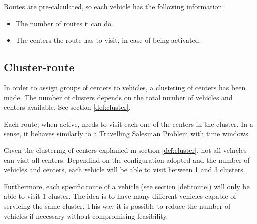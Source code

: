 Routes are pre-calculated, so each vehicle has the following information:

\begin{itemize}
	\item The number of routes it can do.
	\item The centers the route has to visit, in case of being activated.
\end{itemize}

\subsection{Cluster-route}

In order to assign groups of centers to vehicles, a clustering of centers has been made. The number of clusters depends on the total number of vehicles and centers available. See section \ref{def:cluster}.

Each route, when active, needs to visit each one of the centers in the cluster. In a sense, it behaves similarly to a Travelling Salesman Problem with time windows.

Given the clustering of centers explained in section \ref{def:cluster}, not all vehicles can visit all centers. Dependind on the configuration adopted and the number of vehicles and centers, each vehicle will be able to visit between 1 and 3 clusters. 

Furthermore, each specific route of a vehicle (see section \ref{def:route}) will only be able to visit 1 cluster. The idea is to have many different vehicles capable of servicing the same cluster. This way it is possible to reduce the number of vehicles if necessary without compromising feasibility.